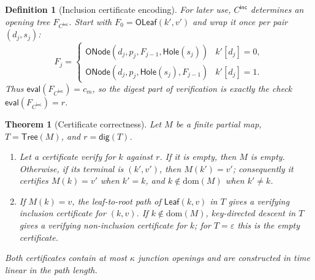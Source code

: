 \documentclass[11pt]{article}
\newtheorem{definition}{Definition}
\newtheorem{theorem}{Theorem}
\begin{document}
\begin{definition}[Inclusion certificate encoding]
For later use, $C^\mathsf{inc}$ determines an opening tree $F_{C^\mathsf{inc}}$. Start with $F_0=\mathsf{OLeaf}(k',v')$ and wrap it once per pair $(d_j,s_j)$:
\[
F_j=\begin{cases}
\mathsf{ONode}(d_j,p_j,F_{j-1},\mathsf{Hole}(s_j)) & k'[d_j]=0,\\
\mathsf{ONode}(d_j,p_j,\mathsf{Hole}(s_j),F_{j-1}) & k'[d_j]=1.
\end{cases}
\]
Thus $\mathsf{eval}(F_{C^\mathsf{inc}})=c_m$, so the digest part of verification is exactly the check $\mathsf{eval}(F_{C^\mathsf{inc}})=r$.
\end{definition}

\begin{theorem}[Certificate correctness]
\label{thm:inclusion-cert}
Let $M$ be a finite partial map, $T=\mathsf{Tree}(M)$, and $r=\mathsf{dig}(T)$.
\begin{enumerate}[nosep,label=(\roman*)]
  \item Let a certificate verify for $k$ against $r$. If it is empty, then $M$ is empty. Otherwise, if its terminal is $(k',v')$, then $M(k')=v'$; consequently it certifies $M(k)=v'$ when $k'=k$, and $k\notin\mathrm{dom}(M)$ when $k'\neq k$.
  \item If $M(k)=v$, the leaf-to-root path of $\mathsf{Leaf}(k,v)$ in $T$ gives a verifying inclusion certificate for $(k,v)$. If $k\notin\mathrm{dom}(M)$, key-directed descent in $T$ gives a verifying non-inclusion certificate for $k$; for $T=\varepsilon$ this is the empty certificate.
\end{enumerate}
Both certificates contain at most $\kappa$ junction openings and are constructed in time linear in the path length.
\end{theorem}
\end{document}
